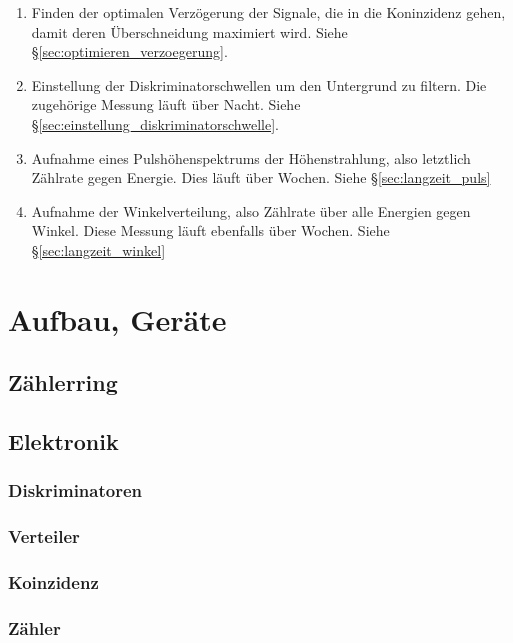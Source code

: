 \documentclass[11pt, ngerman, fleqn, DIV=15, headinclude, BCOR=2cm]{scrreprt}
\begin{document}
\begin{enumerate}
    \item
        Finden der optimalen Verzögerung der Signale, die in die Koninzidenz
        gehen, damit deren Überschneidung maximiert wird. Siehe
        §\ref{sec:optimieren_verzoegerung}.

    \item
        Einstellung der Diskriminatorschwellen um den Untergrund zu filtern.
        Die zugehörige Messung läuft über Nacht. Siehe
        §\ref{sec:einstellung_diskriminatorschwelle}.
        
    \item
        Aufnahme eines Pulshöhenspektrums der Höhenstrahlung, also letztlich
        Zählrate gegen Energie. Dies läuft über Wochen. Siehe
        §\ref{sec:langzeit_puls}

    \item
        Aufnahme der Winkelverteilung, also Zählrate über alle Energien gegen
        Winkel. Diese Messung läuft ebenfalls über Wochen. Siehe
        §\ref{sec:langzeit_winkel}
\end{enumerate}

\section{Aufbau, Geräte}

\subsection{Zählerring}

\subsection{Elektronik}

\subsubsection{Diskriminatoren}

\subsubsection{Verteiler}

\subsubsection{Koinzidenz}

\subsubsection{Zähler}
\end{document}
